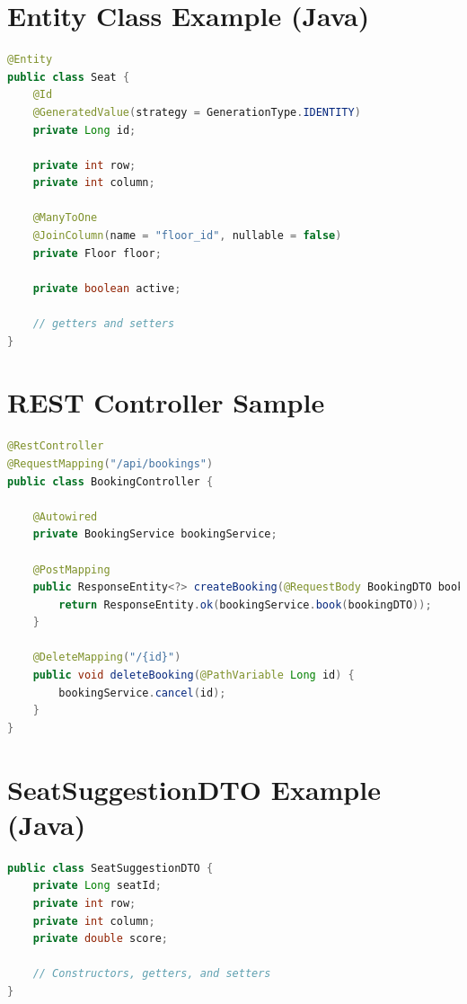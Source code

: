 \documentclass[12pt,a4paper]{report} %
\begin{document}
\newpage

\appendix

\chapter{Entity Class Example (Java)}
\label{appendix:entity}

\begin{lstlisting}[language=Java, caption=Seat Entity (Java), label=lst:seat-entity]
@Entity
public class Seat {
    @Id
    @GeneratedValue(strategy = GenerationType.IDENTITY)
    private Long id;

    private int row;
    private int column;

    @ManyToOne
    @JoinColumn(name = "floor_id", nullable = false)
    private Floor floor;

    private boolean active;

    // getters and setters
}
\end{lstlisting}

\chapter{REST Controller Sample}
\label{appendix:controller}

\begin{lstlisting}[language=Java, caption=Booking Controller (Java), label=lst:booking-controller]
@RestController
@RequestMapping("/api/bookings")
public class BookingController {

    @Autowired
    private BookingService bookingService;

    @PostMapping
    public ResponseEntity<?> createBooking(@RequestBody BookingDTO bookingDTO) {
        return ResponseEntity.ok(bookingService.book(bookingDTO));
    }

    @DeleteMapping("/{id}")
    public void deleteBooking(@PathVariable Long id) {
        bookingService.cancel(id);
    }
}
\end{lstlisting}

\chapter{SeatSuggestionDTO Example (Java)}
\label{appendix:seatdto}

\begin{lstlisting}[language=Java, caption=SeatSuggestionDTO (Java), label=lst:seat-suggestion-dto]
public class SeatSuggestionDTO {
    private Long seatId;
    private int row;
    private int column;
    private double score;

    // Constructors, getters, and setters
}
\end{lstlisting}
\end{document}
